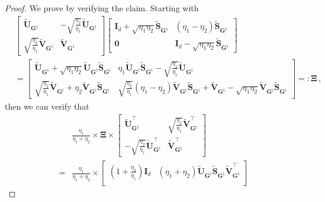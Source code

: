 \begin{proof}
    We prove by verifying the claim. Starting with
    \begin{align*}
        & \begin{bmatrix}
        \widetilde{\bm U}_{\bm G^\natural} & -\sqrt{\frac{\eta_2}{\eta_1}}\widetilde{\bm U}_{\bm G^\natural}\\
        \sqrt{\frac{\eta_2}{\eta_1}}\widetilde{\bm V}_{\bm G^\natural} & \widetilde{\bm V}_{\bm G^\natural}
        \end{bmatrix}\begin{bmatrix}
        \bm I_d+\sqrt{\eta_1\eta_2}\widetilde{\bm S}_{\bm G^\natural} & (\eta_1 - \eta_2)\widetilde{\bm S}_{\bm G^\natural} \\
        \bm 0 & \bm I_d-\sqrt{\eta_1\eta_2}\widetilde{\bm S}_{\bm G^\natural}
        \end{bmatrix}\\
        & =  \begin{bmatrix}
            \widetilde{\bm U}_{\bm G^\natural} + \sqrt{\eta_1\eta_2}\widetilde{\bm U}_{\bm G^\natural}\widetilde{\bm S}_{\bm G^\natural} & \eta_1\widetilde{\bm U}_{\bm G^\natural}\widetilde{\bm S}_{\bm G^\natural} - \sqrt{\frac{\eta_2}{\eta_1}}\widetilde{\bm U}_{\bm G^\natural}\\
            \sqrt{\frac{\eta_2}{\eta_1}}\widetilde{\bm V}_{\bm G^\natural}+\eta_2\widetilde{\bm V}_{\bm G^\natural}\widetilde{\bm S}_{\bm G^\natural} & \sqrt{\frac{\eta_2}{\eta_1}}(\eta_1 - \eta_2)\widetilde{\bm V}_{\bm G^\natural}\widetilde{\bm S}_{\bm G^\natural} + \widetilde{\bm V}_{\bm G^\natural} - \sqrt{\eta_1\eta_2}\widetilde{\bm V}_{\bm G^\natural}\widetilde{\bm S}_{\bm G^\natural}
        \end{bmatrix} =: \bm \Xi \,,
    \end{align*}
    then we can verify that
    \begin{align*}
    & \frac{\eta_1}{\eta_1 + \eta_2}\times \bm \Xi \times\begin{bmatrix}
        \widetilde{\bm U}_{\bm G^\natural}^{\!\top} & \sqrt{\frac{\eta_2}{\eta_1}}\widetilde{\bm V}_{\bm G^\natural}^{\!\top} \\
        -\sqrt{\frac{\eta_2}{\eta_1}}\widetilde{\bm U}_{\bm G^\natural}^{\!\top} & \widetilde{\bm V}_{\bm G^\natural}^{\!\top}
    \end{bmatrix}\\
    = & \frac{\eta_1}{\eta_1 + \eta_2}\times\begin{bmatrix}
        \left(1+\frac{\eta_2}{\eta_1}\right)\bm I_d & (\eta_1 + \eta_2) \widetilde{\bm U}_{\bm G^\natural}\widetilde{\bm S}_{\bm G^\natural}\widetilde{\bm V}_{\bm G^\natural}^{\!\top}\\

\end{bmatrix}
\end{align*}
\end{proof}
